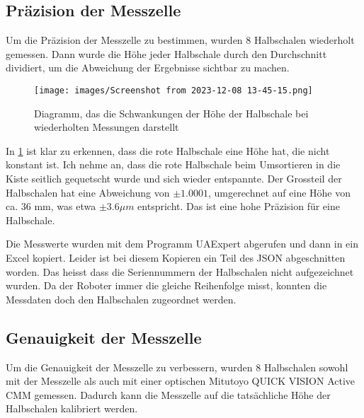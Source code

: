 
\subsection{Präzision der Messzelle}

Um die Präzision der Messzelle zu bestimmen, wurden 8 Halbschalen wiederholt gemessen. Dann wurde die Höhe jeder Halbschale durch den Durchschnitt dividiert, um die Abweichung der Ergebnisse sichtbar zu machen.

\begin{figure}
   
  \texttt{[image: images/Screenshot from 2023-12-08 13-45-15.png]}
  \caption{Diagramm, das die Schwankungen der Höhe der Halbschale bei wiederholten Messungen darstellt}
  \label{fig:Präzision}
\end{figure}

In \ref{fig:Präzision} ist klar zu erkennen, dass die rote Halbschale eine Höhe hat, die nicht konstant ist. Ich nehme an, dass die rote Halbschale beim Umsortieren in die Kiste seitlich gequetscht wurde und sich wieder entspannte. Der Grossteil der Halbschalen hat eine Abweichung von $\pm 1.0001$, umgerechnet auf eine Höhe von ca. $36$ mm, was etwa $\pm 3.6 \mu m$ entspricht. Das ist eine hohe Präzision für eine Halbschale.


Die Messwerte wurden mit dem Programm UAExpert abgerufen und dann in ein Excel kopiert. Leider ist bei diesem Kopieren ein Teil des JSON abgeschnitten worden. Das heisst dass die Seriennummern der Halbschalen nicht aufgezeichnet wurden. Da der Roboter immer die gleiche Reihenfolge misst, konnten die Messdaten doch den Halbschalen zugeordnet werden.


\newpage
\subsection{Genauigkeit der Messzelle}

Um die Genauigkeit der Messzelle zu verbessern, wurden 8 Halbschalen sowohl mit der Messzelle als auch mit einer optischen Mitutoyo QUICK VISION Active CMM gemessen. Dadurch kann die Messzelle auf die tatsächliche Höhe der Halbschalen kalibriert werden.

